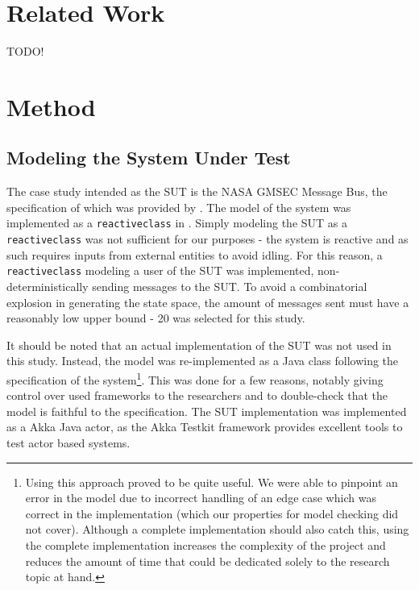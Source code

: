 \documentclass{article}
\begin{document}
	\section{Related Work}
	TODO!
		
	\section{Method}
		\subsection{Modeling the System Under Test}
			The case study intended as the SUT is the NASA GMSEC Message Bus, the specification of which was provided by \citeauthor{fraunhofer}. The model of the system was implemented as a \texttt{reactiveclass} in \Rebeca. Simply modeling the SUT as a \texttt{reactiveclass} was not sufficient for our purposes \-- the system is reactive and as such requires inputs from external entities to avoid idling. For this reason, a \texttt{reactiveclass} modeling a user of the SUT was implemented, non-deterministically sending messages to the SUT. To avoid a combinatorial explosion in generating the state space, the amount of messages sent must have a reasonably low upper bound \-- 20 was selected for this study.

			It should be noted that an actual implementation of the SUT was not used in this study. Instead, the model was re-implemented as a Java class following the specification of the system\footnote{Using this approach proved to be quite useful. We were able to pinpoint an error in the model due to incorrect handling of an edge case which was correct in the implementation (which our properties for model checking did not cover). Although a complete implementation should also catch this, using the complete implementation increases the complexity of the project and reduces the amount of time that could be dedicated solely to the research topic at hand. }. This was done for a few reasons, notably giving control over used frameworks to the researchers and to double-check that the model is faithful to the specification. The SUT implementation was implemented as a Akka Java actor, as the Akka Testkit framework provides excellent tools to test actor based systems.
\end{document}

